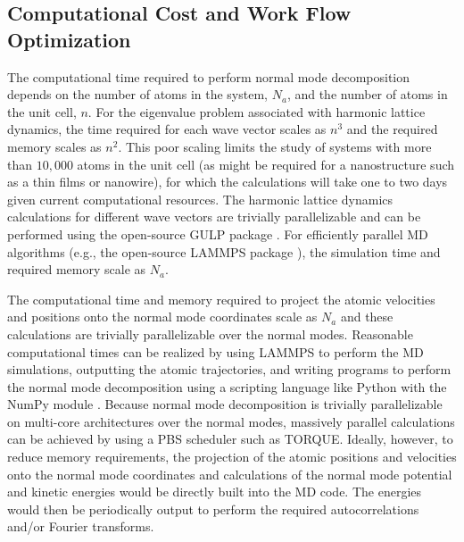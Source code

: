 \subsection{\label{Subsection_Comp_Details_4}Computational Cost 
and Work Flow Optimization}

The computational time required to perform normal mode decomposition 
depends on the number of atoms in the system, $N_a$, and the number of 
atoms in the unit cell, $n$. 
For the eigenvalue problem associated with 
harmonic lattice dynamics, the time required for each wave vector scales 
as $n^3$ and the required memory scales as $n^2$. This poor scaling limits 
the study of systems with more than $10,000$ atoms in the unit cell (as 
might be required for a nanostructure such as a thin films or nanowire), 
for which the calculations will take one to two days given current 
computational resources. The harmonic lattice dynamics calculations for 
different wave vectors are trivially parallelizable and can be performed 
using the open-source GULP package \cite{gale_general_2003}. For 
efficiently parallel MD algorithms (e.g., the open-source LAMMPS package 
\cite{plimpton_fast_1995}), the simulation time and required memory 
scale as $N_a$.

The 
computational time and memory required to project the atomic velocities 
and positions onto the normal mode coordinates scale as $N_a$ and these 
calculations are trivially parallelizable over the normal modes. Reasonable 
computational times can be realized by using LAMMPS to perform the MD 
simulations, outputting the atomic trajectories, and writing programs to 
perform the normal mode decomposition using a scripting language like 
Python with the NumPy module \cite{dubois_numerical_1996}. 
Because normal mode 
decomposition is trivially parallelizable on multi-core architectures over 
the normal modes, massively parallel calculations can be achieved by using 
a PBS scheduler such as TORQUE. Ideally, however, to reduce memory 
requirements, the projection of the atomic positions and velocities onto 
the normal mode coordinates and calculations of the normal mode potential 
and kinetic energies would be directly built into the MD code. The energies 
would then be periodically output to perform the required autocorrelations 
and/or Fourier transforms.


